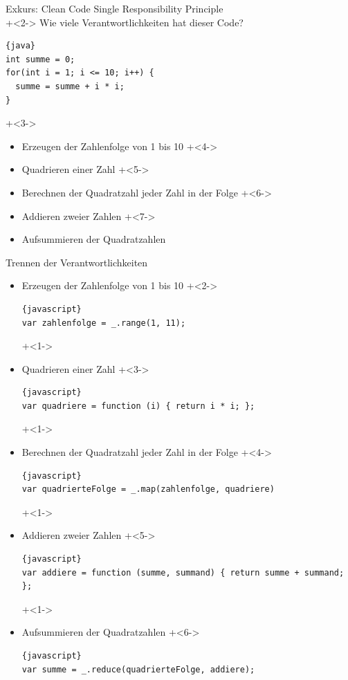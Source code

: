 \begin{frame}[fragile]{Exkurs: Clean Code}
Single Responsibility Principle
\\[2em]

\onslide+<2->
Wie viele Verantwortlichkeiten hat dieser Code?
\begin{lstlisting}{java}
int summe = 0;
for(int i = 1; i <= 10; i++) {
  summe = summe + i * i;
}
\end{lstlisting}

\onslide+<3->
\begin{itemize}
\item Erzeugen der Zahlenfolge von 1 bis 10
\onslide+<4->
\item Quadrieren einer Zahl
\onslide+<5->
\item Berechnen der Quadratzahl jeder Zahl in der Folge
\onslide+<6->
\item Addieren zweier Zahlen
\onslide+<7->
\item Aufsummieren der Quadratzahlen
\end{itemize}

\end{frame}

\begin{frame}[fragile]{Trennen der Verantwortlichkeiten}
\begin{itemize}
\item Erzeugen der Zahlenfolge von 1 bis 10
\onslide+<2->
\begin{lstlisting}{javascript}
var zahlenfolge = _.range(1, 11);
\end{lstlisting}
\onslide+<1->
\item Quadrieren einer Zahl
\onslide+<3->
\begin{lstlisting}{javascript}
var quadriere = function (i) { return i * i; };
\end{lstlisting}
\onslide+<1->
\item Berechnen der Quadratzahl jeder Zahl in der Folge
\onslide+<4->
\begin{lstlisting}{javascript}
var quadrierteFolge = _.map(zahlenfolge, quadriere)
\end{lstlisting}
\onslide+<1->
\item Addieren zweier Zahlen
\onslide+<5->
\begin{lstlisting}{javascript}
var addiere = function (summe, summand) { return summe + summand; };
\end{lstlisting}
\onslide+<1->
\item Aufsummieren der Quadratzahlen
\onslide+<6->
\begin{lstlisting}{javascript}
var summe = _.reduce(quadrierteFolge, addiere);
\end{lstlisting}
\end{itemize}

\end{frame}

